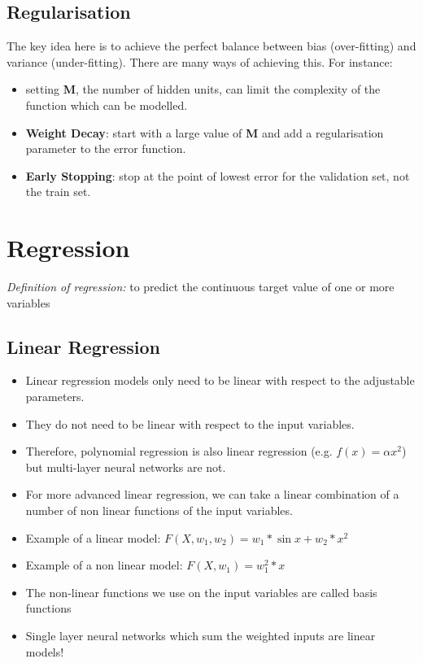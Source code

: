 \documentclass[a4paper]{article}
\begin{document}
\begin{itemize}
		\subsection{Regularisation}
		The key idea here is to achieve the perfect balance between bias (over-fitting) and variance (under-fitting). There are many ways of achieving this. For instance:
		
		\begin{itemize}
			\item setting \textbf{M}, the number of hidden units, can limit the complexity of the function which can be modelled.
			\item \textbf{Weight Decay}: start with a large value of \textbf{M} and add a regularisation parameter to the error function.
			\item \textbf{Early Stopping}: stop at the point of lowest error for the validation set, not the train set.
		\end{itemize} 
		
	\end{itemize}
	
	
	\clearpage
	\section{Regression}
	
	\textit{Definition of regression:} to predict the continuous target value of one or more variables
	
	\subsection{Linear Regression}
	
	\begin{itemize}
	\item Linear regression models only need to be linear with respect to the adjustable parameters.
	\item They do not need to be linear with respect to the input variables.
	\item Therefore, polynomial regression is also linear regression (e.g. $f(x) = \alpha x^2$) but multi-layer neural networks are not.
	
	\item For more advanced linear regression, we can take a linear combination of a number of non linear functions of the input variables.
	
	\item Example of a linear model:
	$F(X, w_1, w_2) = w_1 * \sin{x} + w_2 * x^2$
	
	\item Example of a non linear model:
	$F(X, w_1) = w_1^2 * x$
	
	\item The non-linear functions we use on the input variables are called basis functions
	
	\item Single layer neural networks which sum the weighted inputs are linear models!
	
	\end{itemize}
	
\end{document}
